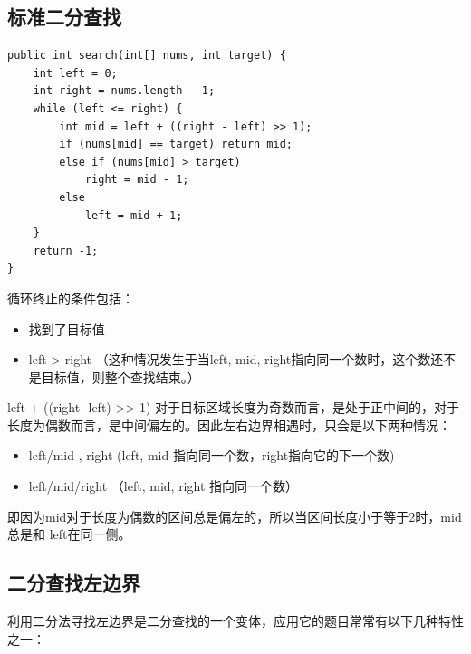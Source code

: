 \documentclass[9pt, b5paaper]{book}
\begin{document}
\subsection{标准二分查找}
\label{sec-5-1-1}
\begin{verbatim}
public int search(int[] nums, int target) {
    int left = 0;
    int right = nums.length - 1;
    while (left <= right) {
        int mid = left + ((right - left) >> 1);
        if (nums[mid] == target) return mid;
        else if (nums[mid] > target) 
            right = mid - 1;
        else 
            left = mid + 1;
    }
    return -1;
}
\end{verbatim}

循环终止的条件包括：

\begin{itemize}
\item 找到了目标值
\item left > right （这种情况发生于当left, mid, right指向同一个数时，这个数还不是目标值，则整个查找结束。）
\end{itemize}

left + ((right -left) >> 1) 对于目标区域长度为奇数而言，是处于正中间的，对于长度为偶数而言，是中间偏左的。因此左右边界相遇时，只会是以下两种情况：

\begin{itemize}
\item left/mid , right (left, mid 指向同一个数，right指向它的下一个数)
\item left/mid/right （left, mid, right 指向同一个数）
\end{itemize}

即因为mid对于长度为偶数的区间总是偏左的，所以当区间长度小于等于2时，mid 总是和 left在同一侧。
\subsection{二分查找左边界}
\label{sec-5-1-2}

利用二分法寻找左边界是二分查找的一个变体，应用它的题目常常有以下几种特性之一：
\end{document}

